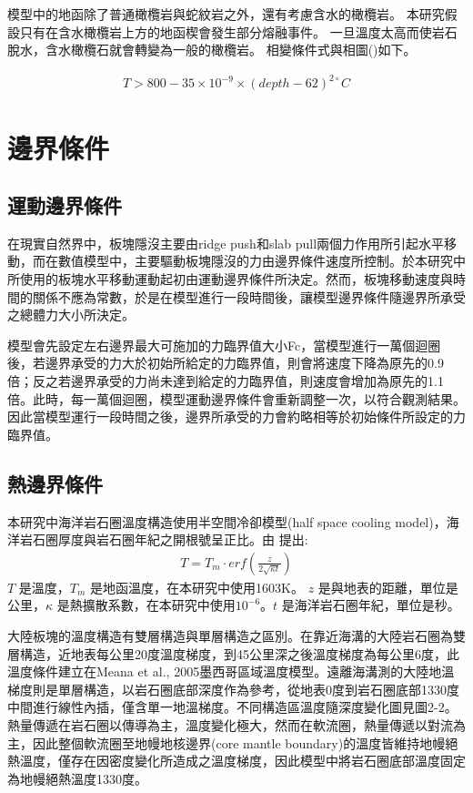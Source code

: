 模型中的地函除了普通橄欖岩與蛇紋岩之外，還有考慮含水的橄欖岩。
本研究假設只有在含水橄欖岩上方的地函楔會發生部分熔融事件。
一旦溫度太高而使岩石脫水，含水橄欖石就會轉變為一般的橄欖岩。
相變條件式與相圖()如下。

\begin{align}
T > 800-35\times 10^{-9}\times (depth-62)^{2\circ}C
\end{align}

\section{邊界條件}

\subsection{運動邊界條件}
在現實自然界中，板塊隱沒主要由ridge push和slab pull兩個力作用所引起水平移動，而在數值模型中，主要驅動板塊隱沒的力由邊界條件速度所控制。於本研究中所使用的板塊水平移動運動起初由運動邊界條件所決定。然而，板塊移動速度與時間的關係不應為常數，於是在模型進行一段時間後，讓模型邊界條件隨邊界所承受之總體力大小所決定。

模型會先設定左右邊界最大可施加的力臨界值大小Fc，當模型進行一萬個迴圈後，若邊界承受的力大於初始所給定的力臨界值，則會將速度下降為原先的0.9倍；反之若邊界承受的力尚未達到給定的力臨界值，則速度會增加為原先的1.1倍。此時，每一萬個迴圈，模型運動邊界條件會重新調整一次，以符合觀測結果。因此當模型運行一段時間之後，邊界所承受的力會約略相等於初始條件所設定的力臨界值。

\subsection{熱邊界條件}
本研究中海洋岩石圈溫度構造使用半空間冷卻模型(half space cooling model)，海洋岩石圈厚度與岩石圈年紀之開根號呈正比。由 \citealp{davis1974}提出:
\begin{align}
T=T_m\cdot {erf}(\frac{z}{2\sqrt{\kappa t}})
\end{align}
$T$ 是溫度，$T_m$ 是地函溫度，在本研究中使用1603K。
$z$ 是與地表的距離，單位是公里，$\kappa$ 是熱擴散系數，在本研究中使用$10^{-6}$。$t$ 是海洋岩石圈年紀，單位是秒。

大陸板塊的溫度構造有雙層構造與單層構造之區別。在靠近海溝的大陸岩石圈為雙層構造，近地表每公里20度溫度梯度，到45公里深之後溫度梯度為每公里6度，此溫度條件建立在Meana et al., 2005墨西哥區域溫度模型。遠離海溝測的大陸地溫梯度則是單層構造，以岩石圈底部深度作為參考，從地表0度到岩石圈底部1330度中間進行線性內插，僅含單一地溫梯度。不同構造區溫度隨深度變化圖見圖2-2。熱量傳遞在岩石圈以傳導為主，溫度變化極大，然而在軟流圈，熱量傳遞以對流為主，因此整個軟流圈至地幔地核邊界(core mantle boundary)的溫度皆維持地幔絕熱溫度，僅存在因密度變化所造成之溫度梯度，因此模型中將岩石圈底部溫度固定為地幔絕熱溫度1330度。

